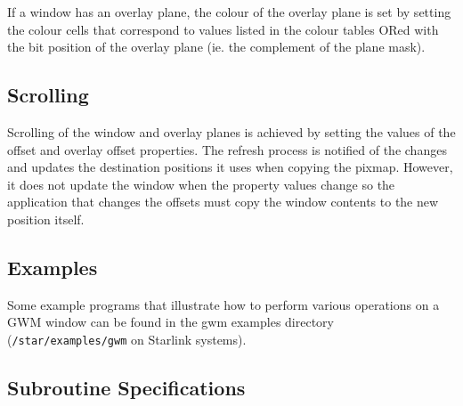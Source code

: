 If a window has an overlay plane, the colour of the overlay plane is set
by setting the colour cells that correspond to values listed in the
colour tables ORed with the bit position of the overlay plane (ie. the
complement of the plane mask).

\subsection{Scrolling}
Scrolling of the window and overlay planes is achieved by setting the
values of the offset and overlay offset properties. The refresh process
is notified of the changes and updates the destination positions it uses
when copying the pixmap. However, it does not update the window when the
property values change so the application that changes the offsets must
copy the window contents to the new position itself.

\subsection{Examples}

Some example programs that illustrate how to perform various operations on a
GWM window can be found in the gwm examples directory ({\tt /star/examples/gwm}
on Starlink systems).

\newpage
\subsection{Subroutine Specifications}

